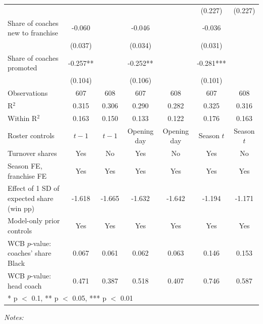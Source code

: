 \begin{table}[!h]
{\begin{threeparttable}
\begin{tabular}[t]{lcccccc}
 &  &  &  &  & (0.227) & (0.227)\\
Share of coaches new to franchise & -0.060 &  & -0.046 &  & -0.036 & \\
 & (0.037) &  & (0.034) &  & (0.031) & \\
Share of coaches promoted & -0.257** &  & -0.252** &  & -0.281*** & \\
 & (0.104) &  & (0.106) &  & (0.101) & \\
\midrule
Observations & 607 & 608 & 607 & 608 & 607 & 608\\
R$^2$ & 0.315 & 0.306 & 0.290 & 0.282 & 0.325 & 0.316\\
Within R$^2$ & 0.163 & 0.150 & 0.133 & 0.122 & 0.176 & 0.163\\
Roster controls & $t-1$ & $t-1$ & Opening day & Opening day & Season $t$ & Season $t$\\
Turnover shares & Yes & No & Yes & No & Yes & No\\
Season FE, franchise FE & Yes & Yes & Yes & Yes & Yes & Yes\\
Effect of 1 SD of expected share (win pp) & -1.618 & -1.665 & -1.632 & -1.642 & -1.194 & -1.171\\
Model-only prior controls & Yes & Yes & Yes & Yes & Yes & Yes\\
WCB $p$-value: coaches' share Black & 0.067 & 0.061 & 0.062 & 0.063 & 0.146 & 0.153\\
WCB $p$-value: head coach & 0.471 & 0.387 & 0.518 & 0.407 & 0.746 & 0.587\\
\bottomrule
\multicolumn{7}{l}{\rule{0pt}{1em}* p $<$ 0.1, ** p $<$ 0.05, *** p $<$ 0.01}\\
\end{tabular}
\begin{tablenotes}[para]
\item \textit{Notes:} 

\end{tablenotes}
\end{threeparttable}}
\end{table}
